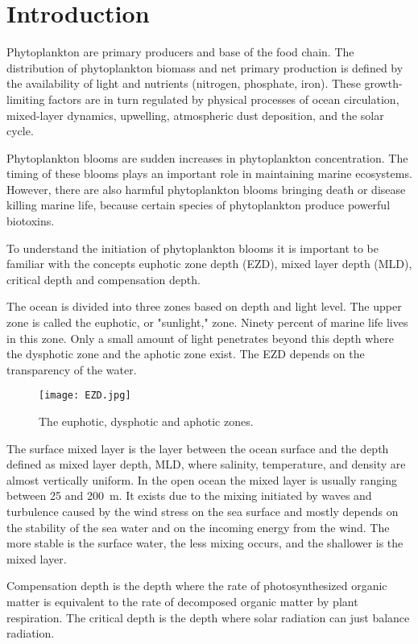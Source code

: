 \documentclass[../Main.tex]{subfiles}
\begin{document}
\section*{\crule[blue]{.3cm}{.3cm} Introduction}
Phytoplankton are primary producers and base of the food chain. 
The distribution of phytoplankton biomass and net primary production is defined by the availability of light and nutrients (nitrogen, phosphate, iron). 
These growth-limiting factors are in turn regulated by physical processes of ocean circulation, mixed-layer dynamics, upwelling, atmospheric dust deposition, and the solar cycle.\supercite{}

Phytoplankton blooms are sudden increases in phytoplankton concentration. 
The timing of these blooms plays an important role in maintaining marine ecosystems. 
However, there are also harmful phytoplankton blooms bringing death or disease killing marine life, 
because certain species of phytoplankton produce powerful biotoxins.\supercite{}

To understand the initiation of phytoplankton blooms it is important to be familiar with the concepts euphotic zone depth (EZD), mixed layer depth (MLD), 
critical depth and compensation depth. 

The ocean is divided into three zones based on depth and light level. 
The upper zone is called the euphotic, or "sunlight," zone. 
Ninety percent of marine life lives in this zone. 
Only a small amount of light penetrates beyond this depth where the dysphotic zone and the aphotic zone exist. 
The EZD depends on the transparency of the water.\supercite{}

\begin{figure}[H]
\texttt{[image: EZD.jpg]}
\caption{ The euphotic, dysphotic and aphotic zones.\supercite{}}
\end{figure}
The surface mixed layer is the layer between the ocean surface and the depth defined as mixed layer depth, MLD, 
where salinity, temperature, and density are almost vertically uniform. 
In the open ocean the mixed layer is usually ranging between 25 and \SI{200}{m}. 
It exists due to the mixing initiated by waves and turbulence caused by the wind stress on the sea surface and mostly depends on the stability of the sea water and on the incoming energy from the wind. 
The more stable is the surface water, the less mixing occurs, and the shallower is the mixed layer.\supercite{}

Compensation depth is the depth where the rate of photosynthesized organic matter is equivalent to the rate of decomposed organic matter by plant respiration. 
The critical depth is the depth where solar radiation can just balance radiation.\supercite{}
\end{document}
